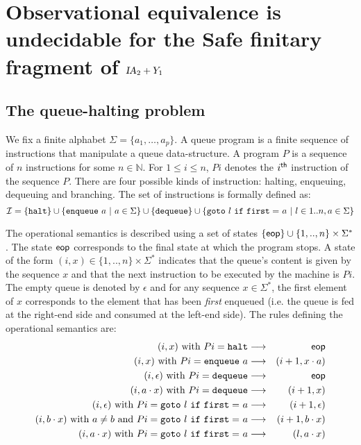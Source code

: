 \documentclass{article}
\newcommand{\nat}{\mathbb{N}}
\newcommand\eop{{\sf eop}}
\newcommand\ialgol{{\textsl{IA}}}
\begin{document}
\section{Observational equivalence is undecidable for the Safe finitary fragment of $\ialgol_2 + Y_1$}

\subsection{The queue-halting problem}
We fix a finite alphabet $\Sigma = \{ a_1, \ldots, a_p \}$. A queue program is a finite sequence of instructions that manipulate a queue data-structure. 
A program $P$ is a sequence of $n$ instructions for some $n\in \nat$. For $1 \leq i \leq n$, $P i$ denotes the $i^{\sf th}$ instruction of the sequence $P$. There are four possible kinds of instruction: halting, enqueuing, dequeuing and branching. The set of instructions is formally defined as:
$$ \mathcal{I} = \{ {\tt halt} \} \cup
\{ {\tt enqueue \ } a \ | \ a \in \Sigma \}
\cup \{ {\tt dequeue} \} \cup \{ {\tt goto\ } l {\tt\ if\ first =\ } a \ | \ l \in 1..n, a \in \Sigma \}
 $$


The operational semantics is described using a set of states $ \{ \eop \} \cup \{ 1,..,n \} \times \Sigma^* $. The state $\eop$ corresponds to the final state at which the program stops. A state of the form $(i,x) \in \{ 1,..,n \} \times \Sigma^*$ indicates that the queue's content is given by the sequence $x$ and that the next instruction to be executed by the machine is $P i$. The empty queue is denoted by $\epsilon$ and for any sequence $x \in \Sigma^*$, the first element of $x$ corresponds to the element that has been \emph{first} enqueued (i.e. the queue is fed at the right-end side and consumed at the left-end side). The rules defining the operational semantics are:
\begin{eqnarray*}
(i,x) \mbox{ with } P i = {\tt halt} &\longrightarrow& \eop \\
(i,x) \mbox{ with } P i = {\tt enqueue\ } a &\longrightarrow& (i+1,x \cdot a) \\
(i,\epsilon) \mbox{ with } P i = {\tt dequeue } &\longrightarrow& \eop \\
(i,a \cdot x) \mbox{ with } P i = {\tt dequeue } &\longrightarrow& (i+1,x) \\
(i,\epsilon) \mbox{ with } P i =  {\tt goto\ } l {\tt\ if\ first =\ } a &\longrightarrow& (i+1,\epsilon) \\
(i,b \cdot x) \mbox{ with } a \neq b \mbox{ and } P i =  {\tt goto\ } l {\tt\ if\ first =\ } a &\longrightarrow& (i+1,b \cdot x) \\
(i,a \cdot x) \mbox{ with } P i =  {\tt goto\ } l {\tt\ if\ first =\ } a &\longrightarrow& (l,a \cdot x)
\end{eqnarray*}
\end{document}
